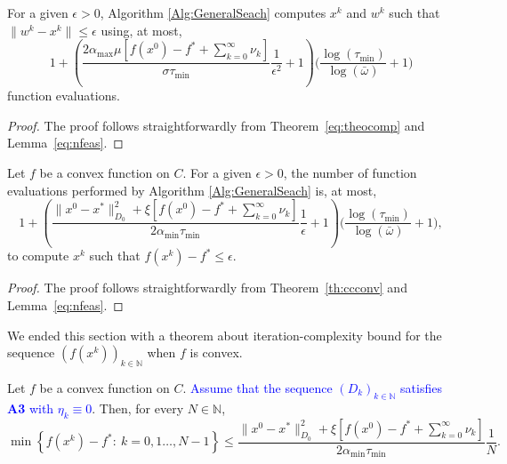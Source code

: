 \begin{theorem}
	For a given $\epsilon>0$, Algorithm \ref{Alg:GeneralSeach} computes $x^k$ and $w^k$ such that $\|  w^{k}-x^{k}\|\leq \epsilon$ using,  at most,
$$1+\left({\frac{2{\alpha_{\max}}\mu\left[f(x^0)-f^* +\sum_{k= 0}^{\infty}\nu_k\right] }{\sigma \tau_{\min}}} \frac{1}{\epsilon^2}+1\right) \Big(\frac{\log (\tau_{\min})}{\log (\bar\omega)}+1\Big)$$
		function evaluations.
	
\end{theorem}
\begin{proof}
	The proof follows straightforwardly from Theorem~\ref{eq:theocomp} and Lemma~\ref{eq:nfeas}.
\end{proof}

\begin{theorem}
	Let $f$ be a convex function on $C$. For a given $\epsilon>0$, the number  of  function evaluations performed by  Algorithm \ref{Alg:GeneralSeach} is,  at most,
	$$1+\left(\frac{\|x^0 - x^*\|^2_{D_0} + \xi\left[f(x^0)-f^*+ \sum_{k=0}^{\infty} \nu_k\right]}{2 \alpha_{\min} \tau_{\min}}\frac{1}{\epsilon} + 1 \right)\Big(\frac{\log (\tau_{\min})}{\log (\bar\omega)}+1\Big),$$
	to compute $x^k$ such that $f(x^k) - f^*\leq \epsilon$.
\end{theorem}
\begin{proof}
	The proof follows straightforwardly from Theorem~\ref{th:ccconv} and  Lemma~\ref{eq:nfeas}.
\end{proof}
We ended this section with a  theorem about  iteration-complexity bound for the sequence $\left(f(x^k)\right)_{k\in\mathbb{N}}$ when $f$ is convex. 
\begin{theorem} \label{th:ccconv}
Let $f$ be a convex function on $C$. \textcolor{blue}{Assume  that    the sequence $(D_k)_{k\in {\mathbb N}}$ satisfies {\bf A3} with $\eta_k\equiv 0$}. Then, for every $N \in \mathbb{N}$,
	$$
		\min \left\{f(x^k) - f^* :~k = 0, 1 \ldots, N-1\right\} \leq \frac{\|x^0 - x^*\|^2_{D_0} + \xi\left[f(x^0)-f^*+ \sum_{k=0}^{\infty} \nu_k\right]}{2 \alpha_{\min} \tau_{\min}}\frac{1}{N}.
	$$
\end{theorem}

